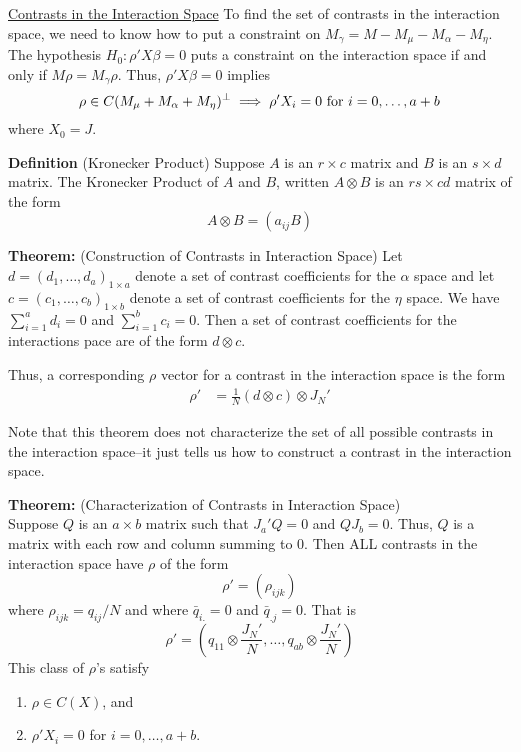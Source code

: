 \documentclass[12pt]{article}
\numberwithin{equation}{section}
\begin{document}
\underline{Contrasts in the Interaction Space}
To find the set of contrasts in the interaction space, we need to know how to put a constraint on $M_\gamma = M - M_\mu - M_\alpha - M_\eta$. The hypothesis $H_0: \rho'X\beta = 0$ puts a constraint on the interaction space if and only if $M\rho = M_\gamma \rho$. Thus, $\rho' X \beta = 0$ implies
%
\begin{equation*}
  \rho \in C(M_\mu + M_\alpha + M_\eta)^{\perp} \\
  \implies \rho' X_i = 0 \text{ for } i = 0, \ldots, a+b
\end{equation*}
where $X_0 = J$.

\textbf{Definition} (Kronecker Product)
Suppose $A$ is an $r \times c$ matrix and $B$ is an $s \times d$ matrix. The Kronecker Product of $A$ and $B$, written 
$A \otimes B$ is an $rs \times cd$ matrix of the form
\begin{equation*}
  A \otimes B = (a_{ij} B)
\end{equation*}

\textbf{Theorem:} (Construction of Contrasts in Interaction Space)
Let $d = (d_1, \ldots, d_a)_{1 \times a}$ denote a set of contrast coefficients for the $\alpha$ space and let $c = (c_1, \ldots, c_b)_{1 \times b}$ denote a set of contrast coefficients for the $\eta$ space. We have $\sum_{i = 1}^a d_i = 0$ and $\sum_{i = 1}^b c_i = 0$. Then a set of contrast coefficients for the interactions pace are of the form $d \otimes c$.

Thus, a corresponding $\rho$ vector for a contrast in the interaction space is the form
\begin{align*}
  \rho' &= \frac{1}{N} (d \otimes c) \otimes J_N'
\end{align*}

Note that this theorem does not characterize the set of all possible contrasts in the interaction space--it just tells us how to construct a contrast in the interaction space.

\textbf{Theorem:} (Characterization of Contrasts in Interaction Space) \\
%
Suppose $Q$ is an $a \times b$ matrix such that $J_a'Q = 0$ and $QJ_b = 0$. Thus, $Q$ is a matrix with each row and column summing to 0. Then ALL contrasts in the interaction space have $\rho$ of the form
\begin{equation*}
  \rho' = (\rho_{ijk})
\end{equation*}
where $\rho_{ijk} = q_{ij} / N$ and where $\bar{q}_{i.} = 0$ and $\bar{q}_{.j} = 0$. That is
\begin{equation*}
  \rho' = \left(q_11 \otimes \frac{J_N'}{N}, \ldots, q_{ab} \otimes \frac{J_N'}{N} \right)
\end{equation*}
%
This class of $\rho$'s satisfy
\begin{enumerate}
  \item $\rho \in C(X)$, and
  \item $\rho' X_i = 0$ for $i = 0, \ldots, a+b$.
\end{enumerate}
\end{document}
